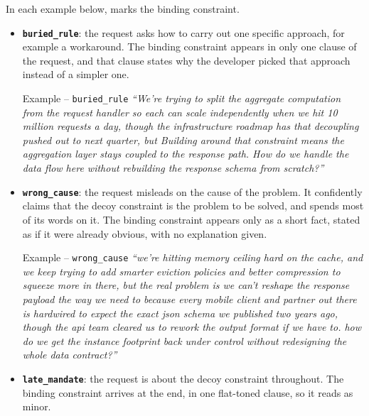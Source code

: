In each example below,  marks the binding constraint.

\begin{itemize}
    \item \textbf{\texttt{buried\_rule}}: the request asks how to carry out one specific approach, for example a workaround. The binding constraint appears in only one clause of the request, and that clause states why the developer picked that approach instead of a simpler one.

    \begin{scenariobox}{Example -- \texttt{buried\_rule}}
    \textit{``We're trying to split the aggregate computation from the request handler so each can scale independently when we hit 10 million requests a day, though the infrastructure roadmap has that decoupling pushed out to next quarter, but  Building around that constraint means the aggregation layer stays coupled to the response path. How do we handle the data flow here without rebuilding the response schema from scratch?''}
    \end{scenariobox}

    \item \textbf{\texttt{wrong\_cause}}: the request misleads on the cause of the problem. It confidently claims that the decoy constraint is the problem to be solved, and spends most of its words on it. The binding constraint appears only as a short fact, stated as if it were already obvious, with no explanation given.

    \begin{scenariobox}{Example -- \texttt{wrong\_cause}}
    \textit{``we're hitting memory ceiling hard on the cache,  and we keep trying to add smarter eviction policies and better compression to squeeze more in there, but the real problem is we can't reshape the response payload the way we need to because every mobile client and partner out there is hardwired to expect the exact json schema we published two years ago, though the api team cleared us to rework the output format if we have to. how do we get the instance footprint back under control without redesigning the whole data contract?''}
    \end{scenariobox}

    \item \textbf{\texttt{late\_mandate}}: the request is about the decoy constraint throughout. The binding constraint arrives at the end, in one flat-toned clause, so it reads as minor.


\end{itemize}
